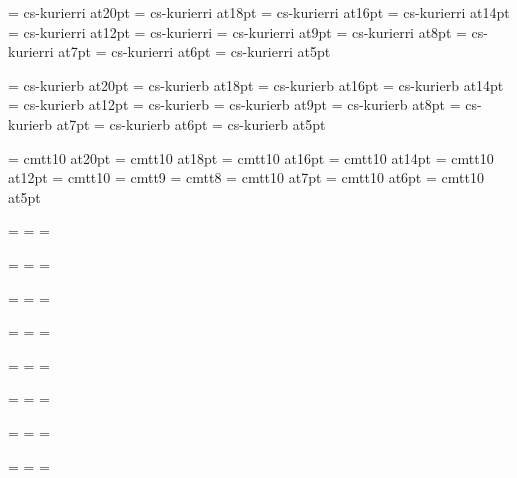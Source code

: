 \font\twentysl=     cs-kurierri at20pt
\font\eighteensl=   cs-kurierri at18pt
\font\sixteensl=    cs-kurierri at16pt
\font\fourteensl=   cs-kurierri at14pt
\font\twelvesl=     cs-kurierri at12pt
\font\tensl=        cs-kurierri
\font\ninesl=       cs-kurierri at9pt
\font\eightsl=      cs-kurierri at8pt
\font\sevensl=      cs-kurierri at7pt
\font\sixsl=        cs-kurierri at6pt
\font\fivesl=       cs-kurierri at5pt

\font\twentybf=     cs-kurierb at20pt
\font\eighteenbf=   cs-kurierb at18pt
\font\sixteenbf=    cs-kurierb at16pt
\font\fourteenbf=   cs-kurierb at14pt
\font\twelvebf=     cs-kurierb at12pt
\font\tenbf=        cs-kurierb
\font\ninebf=       cs-kurierb at9pt
\font\eightbf=      cs-kurierb at8pt
\font\sevenbf=      cs-kurierb at7pt
\font\sixbf=        cs-kurierb at6pt
\font\fivebf=       cs-kurierb at5pt

\font\twentytt=     cmtt10 at20pt
\font\eighteentt=   cmtt10 at18pt
\font\sixteentt=    cmtt10 at16pt
\font\fourteentt=   cmtt10 at14pt
\font\twelvett=     cmtt10 at12pt
\font\tentt=        cmtt10
\font\ninett=       cmtt9
\font\eighttt=      cmtt8
\font\seventt=      cmtt10 at7pt
\font\sixtt=        cmtt10 at6pt
\font\fivett=       cmtt10 at5pt




=\tenrm
{}=\sevenrm
{}=\fiverm
\def\rm{\fam=0 \tenrm}

=\teni
{}=\seveni
{}=\fivei
\def\mit{\fam=1}

=\tensy
{}=\sevensy
{}=\fivesy
\def\cal{\fam=2}

=\tenex
{}=\sevenex
{}=\fiveex


\def\it{\fam=\itfam \tenit}
\textfont\itfam=\tenit
\scriptfont\itfam=\sevenit
\scriptscriptfont\itfam=\fiveit

\def\sl{\fam=\slfam \tensl}
\textfont\slfam=\tensl
\scriptfont\slfam=\sevensl
\scriptscriptfont\slfam=\fivesl

\def\bf{\fam=\bffam \tenbf}
\textfont\bffam=\tenbf
\scriptfont\bffam=\sevenbf
\scriptscriptfont\bffam=\fivebf

\def\tt{\fam=\ttfam \tentt}
\textfont\ttfam=\tentt
\scriptfont\ttfam=\seventt
\scriptscriptfont\ttfam=\fivett

